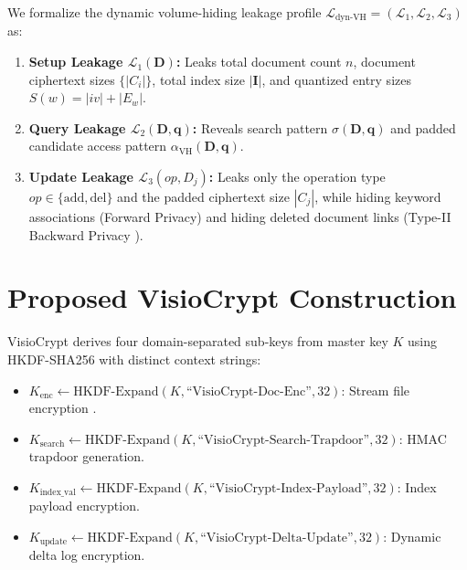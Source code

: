\documentclass[runningheads]{llncs}
\begin{document}
We formalize the dynamic volume-hiding leakage profile $\mathcal{L}_{\text{dyn-VH}} = (\mathcal{L}_1, \mathcal{L}_2, \mathcal{L}_3)$ as:
\begin{enumerate}
    \item \textbf{Setup Leakage $\mathcal{L}_1(\mathbf{D})$:} Leaks total document count $n$, document ciphertext sizes $\{|C_i|\}$, total index size $|\mathbf{I}|$, and quantized entry sizes $S(w) = |iv| + |E_w|$.
    \item \textbf{Query Leakage $\mathcal{L}_2(\mathbf{D}, \mathbf{q})$:} Reveals search pattern $\sigma(\mathbf{D}, \mathbf{q})$ and padded candidate access pattern $\alpha_{\text{VH}}(\mathbf{D}, \mathbf{q})$.
    \item \textbf{Update Leakage $\mathcal{L}_3(op, D_j)$:} Leaks only the operation type $op \in \{\text{add}, \text{del}\}$ and the padded ciphertext size $|C_j|$, while hiding keyword associations (Forward Privacy) and hiding deleted document links (Type-II Backward Privacy \cite{pets2023_dynamic_vh}).
\end{enumerate}

\section{Proposed VisioCrypt Construction}

VisioCrypt derives four domain-separated sub-keys from master key $K$ using HKDF-SHA256 with distinct context strings:
\begin{itemize}
    \item $K_{\text{enc}} \leftarrow \text{HKDF-Expand}(K, \text{``VisioCrypt-Doc-Enc''}, 32)$: Stream file encryption \cite{rueppel1986,mironov2002,bernstein2008}.
    \item $K_{\text{search}} \leftarrow \text{HKDF-Expand}(K, \text{``VisioCrypt-Search-Trapdoor''}, 32)$: HMAC trapdoor generation.
    \item $K_{\text{index\_val}} \leftarrow \text{HKDF-Expand}(K, \text{``VisioCrypt-Index-Payload''}, 32)$: Index payload encryption.
    \item $K_{\text{update}} \leftarrow \text{HKDF-Expand}(K, \text{``VisioCrypt-Delta-Update''}, 32)$: Dynamic delta log encryption.
\end{itemize}
\end{document}
